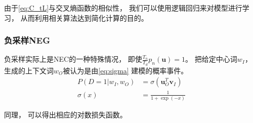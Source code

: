 由于\cref{eq:C_tL}与交叉熵函数的相似性，
我们可以使用逻辑回归来对模型进行学习，
从而利用相关算法达到简化计算的目的。

\subsubsection{负采样NEG}

负采样实际上是NEC的一种特殊情况，
即使$\frac{T_n}{T_d}p_n\left(\mathbf{u}\right)=1$。
把给定中心词$w_I$，
生成的上下文词$w_O$被认为是由\cref{eq:sigma}
建模的概率事件。
\begin{equation}
    \label{eq:sigma}
    \begin{aligned}
        P\left(D=1|w_I,w_O\right) &= \sigma\left(\mathbf{u}_O^T\mathbf{v}_I\right)\\
        \sigma(x)&=\frac{1}{1+\exp(-x)}
    \end{aligned}
\end{equation}

同理，
可以得出相应的对数损失函数。
